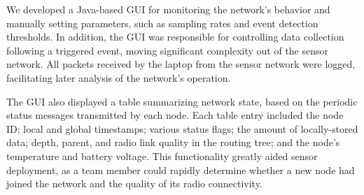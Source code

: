 We developed a Java-based GUI for monitoring the network's behavior and
manually setting parameters, such as sampling rates and event detection
thresholds. In addition, the GUI was responsible for controlling data
collection following a triggered event, moving significant complexity out of
the sensor network. All packets received by the laptop from the sensor
network were logged, facilitating later analysis of the network's operation.

The GUI also displayed a table summarizing network state, based on the
periodic status messages transmitted by each node. Each table entry included
the node ID; local and global timestamps; various status flags; the amount of
locally-stored data; depth, parent, and radio link quality in the routing
tree; and the node's temperature and battery voltage. This functionality
greatly aided sensor deployment, as a team member could rapidly determine
whether a new node had joined the network and the quality of its radio
connectivity.
